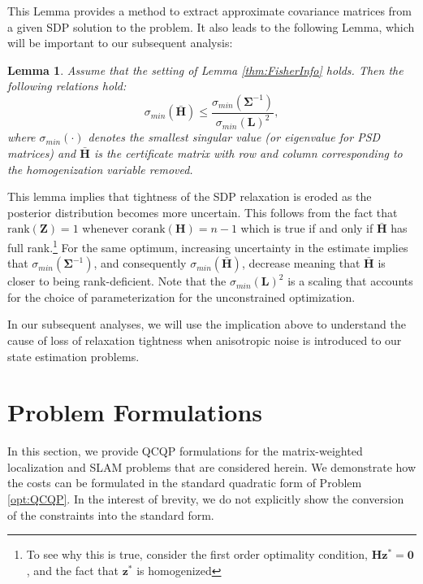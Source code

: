 \documentclass[lettersize,journal]{IEEEtran}
\newtheorem{lemma}[theorem]{Lemma}
\begin{document}
{This Lemma provides a method to extract approximate covariance matrices from a given SDP solution to the problem. It also leads to the following Lemma, which will be important to our subsequent analysis:
\begin{lemma}\label{thm:eig_bounds}
	Assume that the setting of Lemma \ref{thm:FisherInfo} holds. Then the following relations hold:
	\begin{equation}
		\sigma_{min}(\bar{\bm{H}})  \leq \frac{\sigma_{min}(\bm{\Sigma}^{-1})}{\sigma_{min}(\bm{L})^2}, 
	\end{equation}
	where $\sigma_{min}(\cdot)$ denotes the smallest singular value (or eigenvalue for PSD matrices) and $\bar{\bm{H}}$ is the certificate matrix with row and column corresponding to the homogenization variable removed.
\end{lemma}

This lemma implies that tightness of the SDP relaxation is eroded as the posterior distribution becomes more uncertain. This follows from the fact that $\mbox{rank}(\bm{Z})=1$ whenever $\mbox{corank}(\bm{H})=n-1$ which is true if and only if $\bar{\bm{H}}$ has full rank.\footnote{To see why this is true, consider the first order optimality condition, $\bm{H}\bm{z}^*=\bm{0}$, and the fact that $\bm{z}^*$ is homogenized} For the same optimum, increasing uncertainty in the estimate implies that $\sigma_{min}(\bm{\Sigma}^{-1})$, and consequently $\sigma_{min}(\bar{\bm{H}})$, decrease meaning that $\bar{\bm{H}}$ is closer to being rank-deficient. Note that the $\sigma_{min}(\bm{L})^2$ is a scaling that accounts for the choice of parameterization for the unconstrained optimization.

In our subsequent analyses, we will use the implication above to understand the cause of loss of relaxation tightness when anisotropic noise is introduced to our state estimation problems. 
}

\section{Problem Formulations}\label{sec:Formulations}

In this section, we provide QCQP formulations for the matrix-weighted localization and SLAM problems that are considered herein. We demonstrate how the costs can be formulated in the standard quadratic form of Problem \eqref{opt:QCQP}. In the interest of brevity, we do not explicitly show the conversion of the constraints into the standard form.
\end{document}
